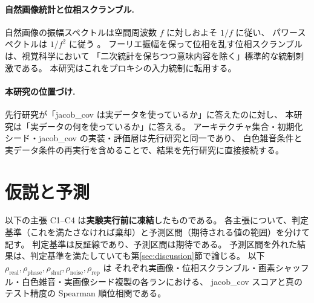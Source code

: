 \documentclass[11pt]{article}
\begin{document}
\paragraph{自然画像統計と位相スクランブル.}
自然画像の振幅スペクトルは空間周波数 $f$ に対しおよそ $1/f$ に従い、
パワースペクトルは $1/f^2$ に従う \cite{vanderschaaf1996power}。
フーリエ振幅を保って位相を乱す位相スクランブルは、視覚科学において
「二次統計を保ちつつ意味内容を除く」標準的な統制刺激である。
本研究はこれをプロキシの入力統制に転用する。

\paragraph{本研究の位置づけ.}
先行研究が「jacob\_cov は実データを使っているか」に答えたのに対し、
本研究は「実データの何を使っているか」に答える。
アーキテクチャ集合・初期化シード・jacob\_cov の実装・評価層は先行研究と同一であり、
白色雑音条件と実データ条件の再実行を含めることで、結果を先行研究に直接接続する。

\section{仮説と予測}
\label{sec:claims}

以下の主張 C1--C4 は\textbf{実験実行前に凍結}したものである。
各主張について、判定基準（これを満たさなければ棄却）と予測区間（期待される値の範囲）を分けて記す。
判定基準は反証線であり、予測区間は期待である。
予測区間を外れた結果は、判定基準を満たしていても第\ref{sec:discussion}節で論じる。
以下 $\rho_{\mathrm{real}}, \rho_{\mathrm{phase}}, \rho_{\mathrm{shuf}}, \rho_{\mathrm{noise}}, \rho_{\mathrm{rep}}$ は
それぞれ実画像・位相スクランブル・画素シャッフル・白色雑音・実画像シード複製の各ランにおける、
jacob\_cov スコアと真のテスト精度の Spearman 順位相関である。
\end{document}
